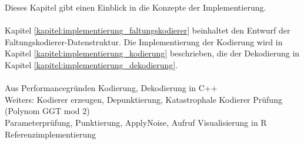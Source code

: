Dieses Kapitel gibt einen Einblick in die Konzepte der Implementierung. 
\\
\\
Kapitel \ref{kapitel:implementierung_faltungskodierer} beinhaltet den Entwurf der Faltungskodierer-Datenstruktur. Die Implementierung der Kodierung wird in Kapitel \ref{kapitel:implementierung_kodierung} beschrieben, die der Dekodierung in Kapitel \ref{kapitel:implementierung_dekodierung}.
\\
\\
Aus Performancegründen Kodierung, Dekodierung in C++\\
Weiters: Kodierer erzeugen, Depunktierung, Katastrophale Kodierer Prüfung (Polynom GGT mod 2)\\
Parameterprüfung, Punktierung, ApplyNoise, Aufruf Visualisierung in R\\
Referenzimplementierung


